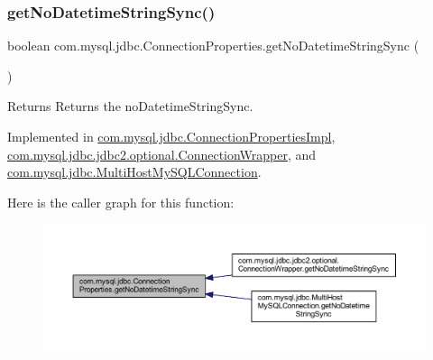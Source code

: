 \subsubsection{\texorpdfstring{get\+No\+Datetime\+String\+Sync()}{getNoDatetimeStringSync()}}
{\footnotesize\ttfamily boolean com.\+mysql.\+jdbc.\+Connection\+Properties.\+get\+No\+Datetime\+String\+Sync (\begin{DoxyParamCaption}{ }\end{DoxyParamCaption})}

\begin{DoxyReturn}{Returns}
Returns the no\+Datetime\+String\+Sync. 
\end{DoxyReturn}


Implemented in \mbox{\hyperlink{classcom_1_1mysql_1_1jdbc_1_1_connection_properties_impl_a3ed9fdc9cce4d4af314bd168fefa4224}{com.\+mysql.\+jdbc.\+Connection\+Properties\+Impl}}, \mbox{\hyperlink{classcom_1_1mysql_1_1jdbc_1_1jdbc2_1_1optional_1_1_connection_wrapper_aa17bed727b36f4557e32e581a7abff7f}{com.\+mysql.\+jdbc.\+jdbc2.\+optional.\+Connection\+Wrapper}}, and \mbox{\hyperlink{classcom_1_1mysql_1_1jdbc_1_1_multi_host_my_s_q_l_connection_a6b3c51428efc616f8a08b2e5c70b75cd}{com.\+mysql.\+jdbc.\+Multi\+Host\+My\+S\+Q\+L\+Connection}}.

Here is the caller graph for this function\+:\nopagebreak
\begin{figure}[H]
\begin{center}
\leavevmode
\includegraphics[width=350pt]{interfacecom_1_1mysql_1_1jdbc_1_1_connection_properties_aa2bc32d658c0dbe027280d159da5dd49_icgraph}
\end{center}
\end{figure}
\mbox{\label{interfacecom_1_1mysql_1_1jdbc_1_1_connection_properties_ad21609c6c63ee0b69b4abdd5c4c7f39c}} 
